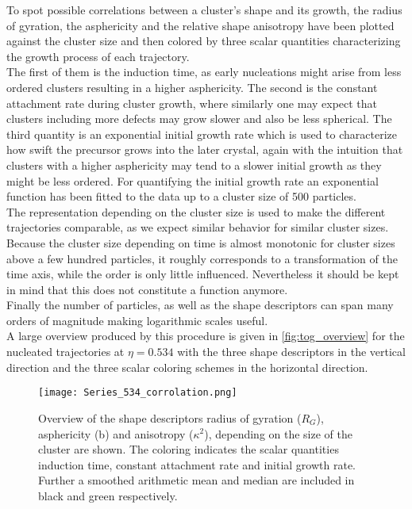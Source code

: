 To spot possible correlations between a cluster's shape and its growth, the radius of gyration, the asphericity and the relative shape anisotropy have been plotted against the cluster size and then colored by three scalar quantities characterizing the growth process of each trajectory.\\ 
The first of them is the induction time, as early nucleations might arise from less ordered clusters resulting in a higher asphericity. The second is the constant attachment rate during cluster growth, where similarly one may expect that clusters including more defects may grow slower and also be less spherical. The third quantity is an exponential initial growth rate which is used to characterize how swift the precursor grows into the later crystal, again with the intuition that clusters with a higher asphericity may tend to a slower initial growth as they might be less ordered. For quantifying the initial growth rate an exponential function has been fitted to the data up to a cluster size of 500 particles.\\
The representation depending on the cluster size is used to make the different trajectories comparable, as we expect similar behavior for similar cluster sizes. Because the cluster size depending on time is almost monotonic for cluster sizes above a few hundred particles, it roughly corresponds to a transformation of the time axis, while the order is only little influenced. Nevertheless it should be kept in mind that this does not constitute a function anymore.\\
Finally the number of particles, as well as the shape descriptors can span many orders of magnitude making logarithmic scales useful.\\

A large overview produced by this procedure is given in \autoref{fig:tog_overview} for the nucleated trajectories at $\eta=0.534$ with the three shape descriptors in the vertical direction and the three scalar coloring schemes in the horizontal direction.\\

\begin{figure}[!h]
\centering
\texttt{[image: Series\_534\_corrolation.png]}
\caption[Tensor of gyration measurements from production data]{Overview of the shape descriptors radius of gyration ($R_G$), asphericity (b) and anisotropy ($\kappa^2$), depending on the size of the cluster are shown. The coloring indicates the scalar quantities induction time, constant attachment rate and initial growth rate. Further a smoothed arithmetic mean and median are included in black and green respectively.}
\label{fig:tog_overview}
\end{figure}

